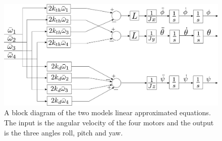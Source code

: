 \begin{figure}[H]
	\centering
	\includegraphics[scale=0.45]{figures/LinearModelBlockDiagram.pdf}
	\caption{A block diagram of the two models linear approximated equations. The input is the angular velocity of the four motors and the output is the three angles roll, pitch and yaw.}
	\label{fig:LinearModelBlockDiagram}
\end{figure}

